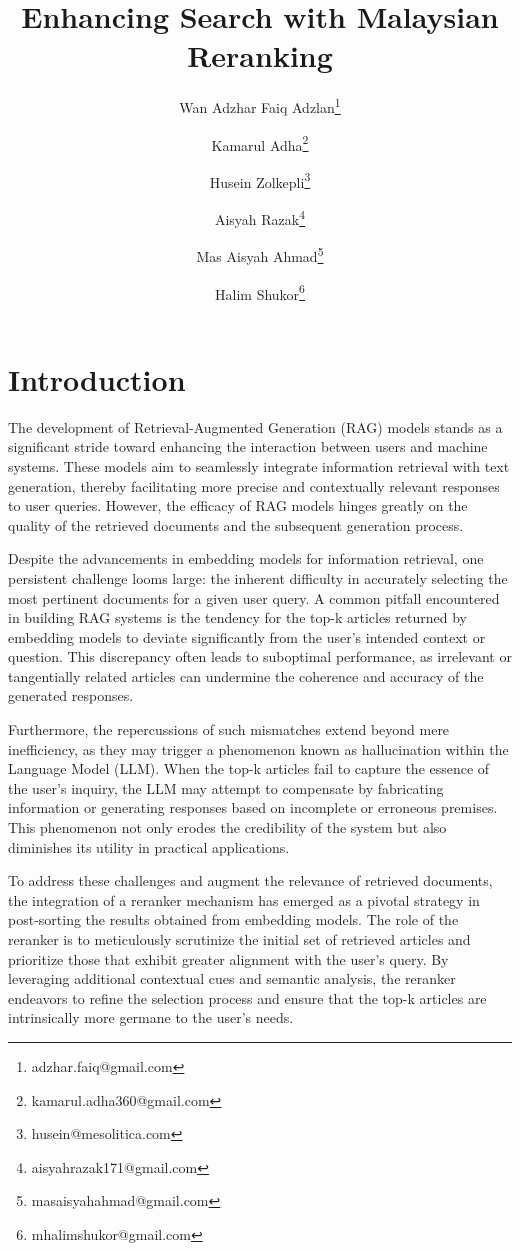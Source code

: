 \documentclass[preprint]{article}
\title{Enhancing Search with Malaysian Reranking}
\author{
  Wan Adzhar Faiq Adzlan\thanks{adzhar.faiq@gmail.com} \and
  Kamarul Adha\thanks{kamarul.adha360@gmail.com} \and
  Husein Zolkepli\thanks{husein@mesolitica.com} \and
  Aisyah Razak\thanks{aisyahrazak171@gmail.com} \and
  Mas Aisyah Ahmad\thanks{masaisyahahmad@gmail.com} \and
  Halim Shukor\thanks{mhalimshukor@gmail.com} \and
}
\begin{document}
\maketitle

\begin{abstract}


\end{abstract}

\section{Introduction}

The development of Retrieval-Augmented Generation (RAG) models stands as a significant stride toward enhancing the interaction between users and machine systems. These models aim to seamlessly integrate information retrieval with text generation, thereby facilitating more precise and contextually relevant responses to user queries. However, the efficacy of RAG models hinges greatly on the quality of the retrieved documents and the subsequent generation process.

Despite the advancements in embedding models for information retrieval, one persistent challenge looms large: the inherent difficulty in accurately selecting the most pertinent documents for a given user query. A common pitfall encountered in building RAG systems is the tendency for the top-k articles returned by embedding models to deviate significantly from the user's intended context or question. This discrepancy often leads to suboptimal performance, as irrelevant or tangentially related articles can undermine the coherence and accuracy of the generated responses.

Furthermore, the repercussions of such mismatches extend beyond mere inefficiency, as they may trigger a phenomenon known as hallucination within the Language Model (LLM). When the top-k articles fail to capture the essence of the user's inquiry, the LLM may attempt to compensate by fabricating information or generating responses based on incomplete or erroneous premises. This phenomenon not only erodes the credibility of the system but also diminishes its utility in practical applications.

To address these challenges and augment the relevance of retrieved documents, the integration of a reranker mechanism has emerged as a pivotal strategy in post-sorting the results obtained from embedding models. The role of the reranker is to meticulously scrutinize the initial set of retrieved articles and prioritize those that exhibit greater alignment with the user's query. By leveraging additional contextual cues and semantic analysis, the reranker endeavors to refine the selection process and ensure that the top-k articles are intrinsically more germane to the user's needs.
\end{document}
